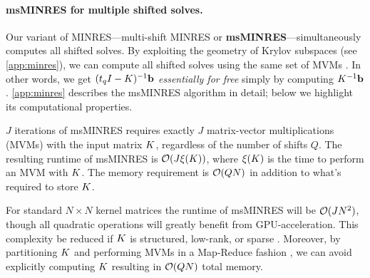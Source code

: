\paragraph{msMINRES for multiple shifted solves.}
Our variant of MINRES---multi-shift MINRES or {\bf msMINRES}---simultaneously computes all shifted solves.
By exploiting the geometry of Krylov subspaces (see \cref{app:minres}), we can compute all shifted solves using the same set of MVMs \cite{jegerlehner1996krylov,aune2013iterative}.
In other words, we get $(t_q I - K)^{-1} \mathbf{b}$ \emph{essentially for free} simply by computing $K^{-1} \mathbf{b}$.
\cref{app:minres} describes the msMINRES algorithm in detail; below we highlight its computational properties.

\begin{property}
  $J$ iterations of msMINRES requires exactly $J$ matrix-vector multiplications (MVMs) with the input matrix $K$,
  regardless of the number of shifts $Q$.
  The resulting runtime of msMINRES is $\bigo{ J \mvm{\bK}}$, where $\xi ( K )$ is the time to perform an MVM with $K$.
  The memory requirement is $\bigo{ QN }$ in addition to what's required to store $K$.
\end{property}
%
For standard $N \! \times \! N$ kernel matrices the runtime of msMINRES will be $\bigo{J N^2}$, though all quadratic operations will greatly benefit from GPU-acceleration.
This complexity be reduced if $K$ is structured, low-rank, or sparse .
Moreover, by partitioning $K$ and performing MVMs in a Map-Reduce fashion \cite{wang2019exact,charlier2020kernel}, we can avoid explicitly computing $K$ resulting in $\bigo{QN}$ total memory.

